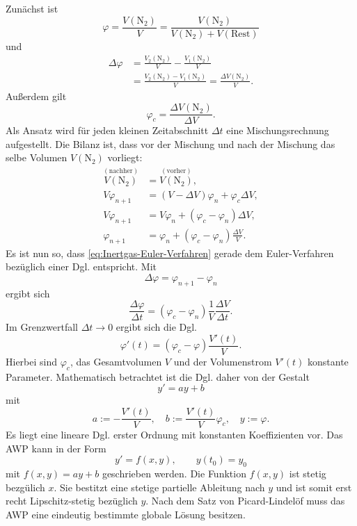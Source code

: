 \documentclass[a4paper,10pt,fleqn,twocolumn,twoside]{scrartcl}
\numberwithin{equation}{section}
\begin{document}
Zunächst ist
\begin{equation}
\varphi = \frac{V(\mathrm{N_2})}{V}
= \frac{V(\mathrm{N_2})}{V(\mathrm{N_2})+V(\mathrm{Rest})}
\end{equation}
und
\begin{equation}
\begin{split}
\Delta\varphi &= \frac{V_2(\mathrm{N_2})}{V}-\frac{V_1(\mathrm{N_2})}{V}\\
&= \frac{V_2(\mathrm{N_2})-V_1(\mathrm{N_2})}{V} = \frac{\Delta V(\mathrm{N_2})}{V}.
\end{split}
\end{equation}
Außerdem gilt
\begin{equation}
\varphi_c = \frac{\Delta V(\mathrm{N_2})}{\Delta V}.
\end{equation}
Als Ansatz wird für jeden kleinen Zeitabschnitt $\Delta t$ eine
Mischungsrechnung aufgestellt. Die Bilanz ist, dass vor der
Mischung und nach der Mischung das selbe Volumen $V(\mathrm{N_2})$
vorliegt:
\begin{align}
\overset{(\mathrm{nachher})}{V(\mathrm{N_2})} &= \overset{(\mathrm{vorher})}{V(\mathrm{N_2})},\\
\label{eq:Intertgas-Differenzengleichung}
V\varphi_{n+1} &= (V-\Delta V)\varphi_n +\varphi_c\Delta V,\\
V\varphi_{n+1} &= V\varphi_n+(\varphi_c-\varphi_n)\Delta V,\\
\label{eq:Inertgas-Euler-Verfahren}
\varphi_{n+1} &= \varphi_n+(\varphi_c-\varphi_n)\frac{\Delta V}{V}.
\end{align}
Es ist nun so, dass \eqref{eq:Inertgas-Euler-Verfahren} gerade
dem Euler-Verfahren bezüglich einer Dgl. entspricht. Mit
\begin{equation}
\Delta\varphi = \varphi_{n+1}-\varphi_{n}
\end{equation}
ergibt sich
\begin{equation}
\frac{\Delta\varphi}{\Delta t} = (\varphi_c-\varphi_n)\frac{1}{V}\frac{\Delta V}{\Delta t}.
\end{equation}
Im Grenzwertfall $\Delta t\to 0$ ergibt sich die Dgl.
\begin{equation}
\varphi'(t) = (\varphi_c-\varphi)\frac{V'(t)}{V}.
\end{equation}
Hierbei sind $\varphi_c$, das Gesamtvolumen $V$ und der
Volumenstrom $V'(t)$ konstante Parameter.
Mathematisch betrachtet ist die Dgl. daher von der Gestalt
\begin{equation}
y' = ay+b
\end{equation}
mit
\begin{equation}
a:=-\frac{V'(t)}{V},\quad b:=\frac{V'(t)}{V}\varphi_c,\quad y:=\varphi.
\end{equation}
Es liegt eine lineare Dgl. erster Ordnung mit konstanten
Koeffizienten vor. Das AWP kann in der Form
\begin{equation}
y' = f(x,y),\qquad y(t_0)=y_0
\end{equation}
mit $f(x,y)=ay+b$ geschrieben werden. Die Funktion $f(x,y)$
ist stetig bezgülich $x$. Sie bestitzt eine stetige partielle
Ableitung nach $y$ und ist somit erst recht Lipschitz-stetig
bezüglich $y$. Nach dem Satz von Picard-Lindelöf muss das AWP
eine eindeutig bestimmte globale Lösung besitzen.
\end{document}

